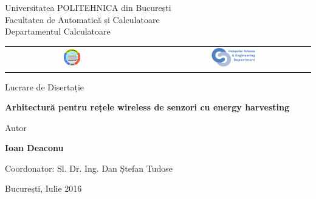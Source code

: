


\pagestyle{empty}
\sffamily

\noindent
\begin{center}
	\Large
	Universitatea POLITEHNICA din București\\
	Facultatea de Automatică și Calculatoare\\
	Departamentul Calculatoare\\
	\begin{table}[h]
		\begin{center}
			\begin{tabular}{cccc}
				\includegraphics[width=0.13\textwidth]
				{img/upb.png}
				& & &
				\includegraphics[width=0.30\textwidth]
				{img/cs.png}
			\end{tabular}
		\end{center}
	\end{table}
\end{center}

\vfill\vfill
\begin{center}
	\Large
	Lucrare de Disertație\\
\end{center}

\vfill
\begin{center}
	\HUGE\bfseries
	Arhitectură pentru rețele wireless de senzori cu energy harvesting\\
	\vfill
	\large
\end{center}

\vfill
\begin{center}
	\Large
	Autor
\end{center}

\begin{center}
	\huge\bfseries
	Ioan Deaconu
\end{center}

\vfill\vfill\vfill
\begin{center}
	\Large
	Coordonator: Sl. Dr. Ing. Dan Ștefan Tudose\\
\end{center}

\vfill
\begin{center}
	\large
	București, Iulie 2016
\end{center}

\cleardoublepage


